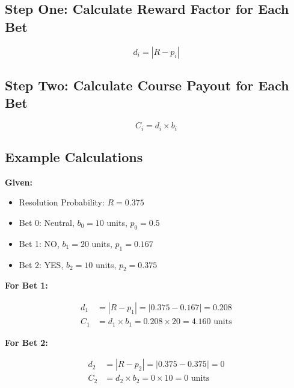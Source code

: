 \documentclass{article}
\begin{document}
\subsection*{Step One: Calculate Reward Factor for Each Bet}

\[
d_i = |R - p_i|
\]

\subsection*{Step Two: Calculate Course Payout for Each Bet}

\[
C_i = d_i \times b_i
\]

\subsection*{Example Calculations}

\textbf{Given:}

\begin{itemize}
  \item Resolution Probability: \( R = 0.375 \)
  \item Bet 0: Neutral, \( b_0 = 10 \) units, \( p_0 = 0.5 \)
  \item Bet 1: NO, \( b_1 = 20 \) units, \( p_1 = 0.167 \)
  \item Bet 2: YES, \( b_2 = 10 \) units, \( p_2 = 0.375 \)
\end{itemize}

\textbf{For Bet 1:}

\begin{align*}
d_1 &= |R - p_1| = |0.375 - 0.167| = 0.208 \\
C_1 &= d_1 \times b_1 = 0.208 \times 20 = 4.160 \text{ units}
\end{align*}

\textbf{For Bet 2:}

\begin{align*}
d_2 &= |R - p_2| = |0.375 - 0.375| = 0 \\
C_2 &= d_2 \times b_2 = 0 \times 10 = 0 \text{ units}
\end{align*}

\end{document}
